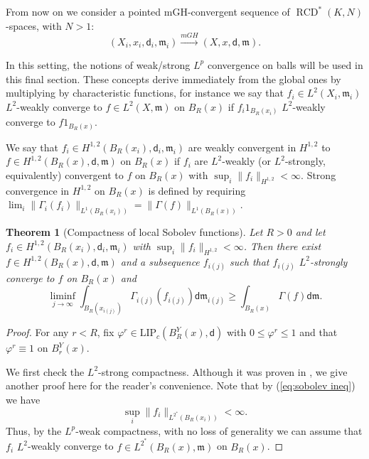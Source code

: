 \documentclass[a4paper,11pt,reqno]{article}
\numberwithin{equation}{section}
\theoremstyle{plain}
\newtheorem{theorem}{Theorem}[section]
\theoremstyle{definition}
\theoremstyle{remark}
\let\altphi\phi
\let\phi\varphi
\let\varphi\altphi
\let\altphi\undefined
\newcommand{\dist}{\mathsf{d}}
\newcommand{\meas}{\mathfrak{m}}
\DeclareMathOperator{\RCD}{RCD}
\begin{document}
{From now on we consider a pointed mGH-convergent sequence of $\RCD^*(K, N)$-spaces, with $N>1$: 
$$
(X_i, x_i, \dist_i, \meas_i) \stackrel{mGH}{\to} (X, x, \dist, \meas).
$$

In this setting, the notions of weak/strong $L^p$ convergence on balls will be used in this final
section. These concepts derive immediately from the global ones by multiplying by characteristic functions, for instance
we say that $f_i\in L^2(X_i,\meas_i)$ $L^2$-weakly converge to $f\in L^2(X,\meas)$ on $B_R(x)$ if
$f_i1_{B_R(x_i)}$ $L^2$-weakly converge to $f1_{B_R(x)}$.


\begin{definition}
We say that $f_i \in H^{1, 2}(B_R(x_i), \dist_i, \meas_i)$ are weakly convergent in $H^{1, 2}$ to 
$f \in H^{1, 2}(B_R(x), \dist, \meas)$ on $B_R(x)$ if $f_i$ are $L^2$-weakly (or $L^2$-strongly, equivalently) 
convergent to $f$ on $B_R(x)$ with $\sup_i\|f_i\|_{H^{1, 2}}<\infty$.
Strong convergence in $H^{1, 2}$ on $B_R(x)$ is defined by requiring 
$\lim_i\|\Gamma_i(f_i)\|_{L^1(B_R(x_i))}=\|\Gamma(f)\|_{L^1(B_R(x))}$.
\end{definition}

\begin{theorem}[Compactness of local Sobolev functions]\label{thm:compact loc sob}
Let $R>0$ and let $f_i \in H^{1, 2}(B_{R}(x_i), \dist_i, \meas_i)$ with $\sup_i\|f_i\|_{H^{1, 2}}<\infty$.
Then there exist $f \in H^{1, 2}(B_{R}(x), \dist, \meas)$ and a subsequence $f_{i(j)}$ such that $f_{i(j)}$ $L^2$-strongly converge to $f$ on $B_R(x)$
and  
$$
\liminf_{j \to \infty}\int_{B_R(x_{i(j)})}\Gamma_{i(j)}(f_{i(j)})\dist \meas_{i(j)} \ge \int_{B_R(x)}\Gamma(f)\dist \meas.
$$  
\end{theorem}
\begin{proof}  For any $r<R$, fix $\phi^r\in \mathrm{LIP}_c(B^Y_R(x), \dist)$ with
$0 \le \phi^r\le 1$ and that $\phi^r\equiv 1$ on $B^Y_r(x)$.

We first check the $L^2$-strong compactness. Although it was proven in \cite{Honda2}, we give another proof here for 
the reader's convenience. Note that by (\ref{eq:sobolev ineq}) we have 
\begin{equation}\label{eq:equi bound}
\sup_i\|f_i\|_{L^{2^*}(B_R(x_i))}<\infty.
\end{equation}
Thus, by the $L^p$-weak compactness, with no loss of generality we can assume that $f_i$ $L^2$-weakly converge 
to $f \in L^{2^*}(B_R(x), \meas)$ on $B_R(x)$.


\end{proof}}
\end{document}
